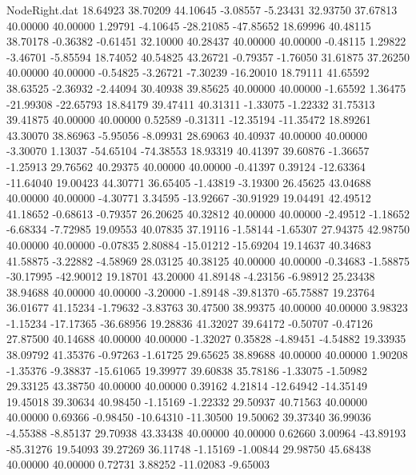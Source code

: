 \begin{filecontents}{NodeRight.dat}
  18.64923   38.70209   44.10645    -3.08557   -5.23431   32.93750   37.67813   40.00000   40.00000    1.29791   -4.10645  -28.21085  -47.85652
  18.69996   40.48115   38.70178    -0.36382   -0.61451   32.10000   40.28437   40.00000   40.00000   -0.48115    1.29822   -3.46701   -5.85594
  18.74052   40.54825   43.26721    -0.79357   -1.76050   31.61875   37.26250   40.00000   40.00000   -0.54825   -3.26721   -7.30239  -16.20010
  18.79111   41.65592   38.63525    -2.36932   -2.44094   30.40938   39.85625   40.00000   40.00000   -1.65592    1.36475  -21.99308  -22.65793
  18.84179   39.47411   40.31311    -1.33075   -1.22332   31.75313   39.41875   40.00000   40.00000    0.52589   -0.31311  -12.35194  -11.35472
  18.89261   43.30070   38.86963    -5.95056   -8.09931   28.69063   40.40937   40.00000   40.00000   -3.30070    1.13037  -54.65104  -74.38553
  18.93319   40.41397   39.60876    -1.36657   -1.25913   29.76562   40.29375   40.00000   40.00000   -0.41397    0.39124  -12.63364  -11.64040
  19.00423   44.30771   36.65405    -1.43819   -3.19300   26.45625   43.04688   40.00000   40.00000   -4.30771    3.34595  -13.92667  -30.91929
  19.04491   42.49512   41.18652    -0.68613   -0.79357   26.20625   40.32812   40.00000   40.00000   -2.49512   -1.18652   -6.68334   -7.72985
  19.09553   40.07835   37.19116    -1.58144   -1.65307   27.94375   42.98750   40.00000   40.00000   -0.07835    2.80884  -15.01212  -15.69204
  19.14637   40.34683   41.58875    -3.22882   -4.58969   28.03125   40.38125   40.00000   40.00000   -0.34683   -1.58875  -30.17995  -42.90012
  19.18701   43.20000   41.89148    -4.23156   -6.98912   25.23438   38.94688   40.00000   40.00000   -3.20000   -1.89148  -39.81370  -65.75887
  19.23764   36.01677   41.15234    -1.79632   -3.83763   30.47500   38.99375   40.00000   40.00000    3.98323   -1.15234  -17.17365  -36.68956
  19.28836   41.32027   39.64172    -0.50707   -0.47126   27.87500   40.14688   40.00000   40.00000   -1.32027    0.35828   -4.89451   -4.54882
  19.33935   38.09792   41.35376    -0.97263   -1.61725   29.65625   38.89688   40.00000   40.00000    1.90208   -1.35376   -9.38837  -15.61065
  19.39977   39.60838   35.78186    -1.33075   -1.50982   29.33125   43.38750   40.00000   40.00000    0.39162    4.21814  -12.64942  -14.35149
  19.45018   39.30634   40.98450    -1.15169   -1.22332   29.50937   40.71563   40.00000   40.00000    0.69366   -0.98450  -10.64310  -11.30500
  19.50062   39.37340   36.99036    -4.55388   -8.85137   29.70938   43.33438   40.00000   40.00000    0.62660    3.00964  -43.89193  -85.31276
  19.54093   39.27269   36.11748    -1.15169   -1.00844   29.98750   45.68438   40.00000   40.00000    0.72731    3.88252  -11.02083   -9.65003

\end{filecontents}
